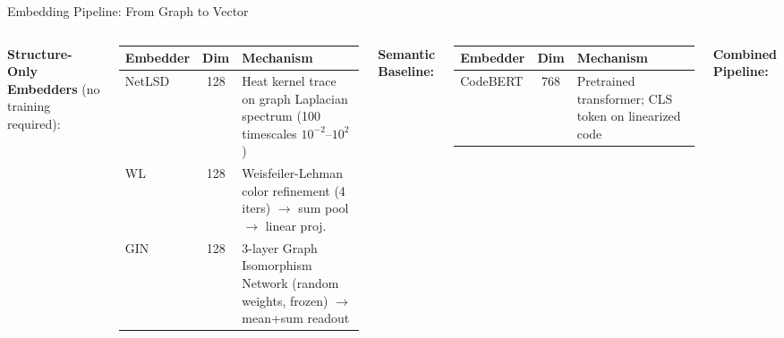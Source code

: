 \documentclass[aspectratio=169,10pt]{beamer}
\begin{document}
\begin{frame}{Embedding Pipeline: From Graph to Vector}

  \begin{columns}[T]

    \textbf{Structure-Only Embedders} (no training required):

    \vspace{0.2cm}
    \begin{table}
      \centering
      \scriptsize
      \begin{tabular}{lcp{4.2cm}}
        \toprule
        \textbf{Embedder} & \textbf{Dim} & \textbf{Mechanism} \\
        \midrule
        NetLSD \cite{netlsd} & 128 & Heat kernel trace on graph Laplacian spectrum (100 timescales $10^{-2}$--$10^{2}$) \\[3pt]
        WL \cite{shervashidze2011wl} & 128 & Weisfeiler-Lehman color refinement (4 iters) $\rightarrow$ sum pool $\rightarrow$ linear proj. \\[3pt]
        GIN \cite{xu2019gin} & 128 & 3-layer Graph Isomorphism Network (random weights, frozen) $\rightarrow$ mean+sum readout \\
        \bottomrule
      \end{tabular}
    \end{table}

    \vspace{0.3cm}
    \textbf{Semantic Baseline:}
    \begin{table}
      \centering
      \scriptsize
      \begin{tabular}{lcp{4.2cm}}
        \toprule
        \textbf{Embedder} & \textbf{Dim} & \textbf{Mechanism} \\
        \midrule
        CodeBERT \cite{feng2020codebert} & 768 & Pretrained transformer; CLS token on linearized code \\
        \bottomrule
      \end{tabular}
    \end{table}

    \textbf{Combined Pipeline:}

    \vspace{0.2cm}
\end{columns}
\end{frame}
\end{document}
